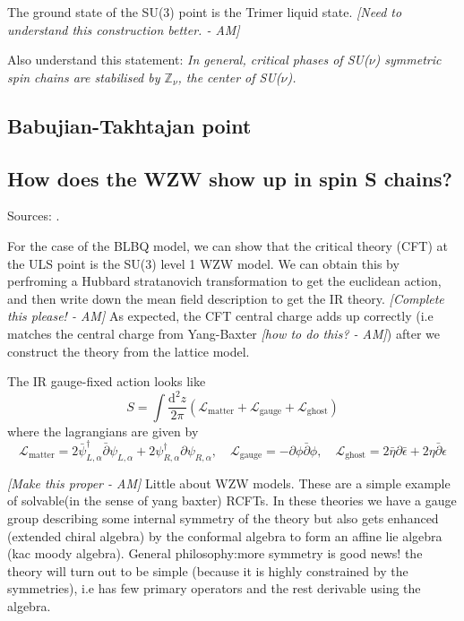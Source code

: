 \documentclass{article}
\newcommand\AM[1]{{\it \color{darkblue}  [#1 - AM]}}
\renewcommand{\d}{\mathrm{d}}
\begin{document}
 The ground state of the SU(3) point is the Trimer liquid state. \AM{Need to understand this construction better.} 
 
 Also understand this statement: \emph{In general, critical phases of SU($\nu$) symmetric spin chains are stabilised by $\mathbb{Z}_\nu$, the center of SU($\nu$).}
\subsection{Babujian-Takhtajan point}
\subsection{How does the WZW show up in spin S chains?}
Sources: \cite{Affleck:1987ch, itoi1997extended}.

For the case of the BLBQ model, we can show that the critical theory (CFT) at the ULS point is the  SU(3) level 1 WZW model. We can obtain this by perfroming a Hubbard stratanovich transformation to get the euclidean action, and then write down the mean field description to get the IR theory. \AM{Complete this please!} As expected, the CFT central charge adds up correctly (i.e matches the central charge from Yang-Baxter\AM{how to do this?}) after we construct the theory from the lattice model.

The IR gauge-fixed action looks like
\begin{equation}
    S = \int \frac{\d^2 z}{2\pi} \left(\mathcal{L}_{\text{matter}} + \mathcal{L}_{\text{gauge}} + \mathcal{L}_{\text{ghost}} \right)
\end{equation}
where the lagrangians are given by
\begin{equation}
    \mathcal{L}_{\text{matter}} = 2 \bar{\psi}^{\dagger}_{L, \alpha} \bar{\partial} \psi_{L, \alpha} + 2\psi^{\dagger}_{R, \alpha} \partial \psi_{R, \alpha} ,\quad 
    \mathcal{L}_{\text{gauge}} = -\partial \phi \bar{\partial} \phi,\quad  \mathcal{L}_{\text{ghost}} = 2 \bar{\eta} \partial \bar{\epsilon} + 2 \eta \bar{\partial} \epsilon
\end{equation}

\AM{Make this proper}
Little about WZW models.
These are a simple example of solvable(in the sense of yang baxter) RCFTs. In these theories we have a gauge group describing some internal symmetry of the theory but also gets enhanced (extended chiral algebra) by the conformal algebra to form an affine lie algebra (kac moody algebra). General philosophy:more symmetry is good news! the theory will turn out to be simple (because it is highly constrained by the symmetries), i.e has few primary operators and the rest derivable using the algebra.  
\end{document}
